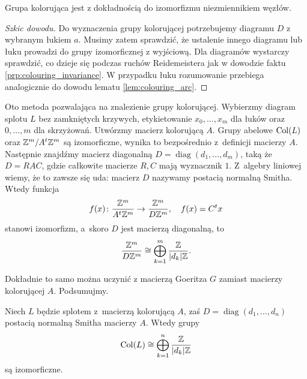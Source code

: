 \begin{proposition}
    Grupa kolorująca jest z dokładnością do izomorfizmu niezmiennikiem węzłów.
\end{proposition}

\begin{proof}[Szkic dowodu]
    Do wyznaczenia grupy kolorującej potrzebujemy diagramu $D$ z wybranym łukiem $a$.
    Musimy zatem sprawdzić, że ustalenie innego diagramu lub łuku prowadzi do grupy izomorficznej z wyjściową.
    Dla diagramów wystarczy sprawdzić, co dzieje się podczas ruchów Reidemeistera jak w dowodzie faktu \ref{prp:colouring_invariance}.
    W przypadku łuku rozumowanie przebiega analogicznie do dowodu lematu \ref{lem:colouring_arc}.
\end{proof}

Oto metoda pozwalająca na znalezienie grupy kolorującej.
Wybierzmy diagram splotu $L$ bez zamkniętych krzywych, etykietowanie $x_0, \ldots, x_m$ dla łuków oraz $0, \ldots, m$ dla skrzyżowań.
Utwórzmy macierz kolorującą $A$.
Grupy abelowe $\operatorname{Col}(L)$ oraz $\mathbb Z^m / A^t \mathbb Z^m$ są izomorficzne, wynika to bezpośrednio z~definicji macierzy $A$.
Następnie znajdźmy macierz diagonalną $D = \operatorname{diag}(d_1, \ldots, d_m)$, taką że $D = RAC$, gdzie całkowite macierze $R, C$ mają wyznacznik $1$.
Z~algebry liniowej wiemy, że to zawsze się uda: macierz $D$ nazywamy postacią normalną Smitha.
Wtedy funkcja
\begin{equation}
    f(x) \colon \frac{\mathbb Z^m}{A^t \mathbb Z^m} \to \frac{\mathbb Z^m}{D\mathbb Z^m}, \quad f(x) = C^t x
\end{equation}
stanowi izomorfizm, a~skoro $D$ jest macierzą diagonalną, to
\begin{equation}
    \frac{\mathbb Z^m}{D\mathbb Z^m} \cong \bigoplus_{k=1}^m \frac{\mathbb Z}{|d_k| \mathbb Z}.
\end{equation}

Dokładnie to samo można uczynić z macierzą Goeritza $G$ zamiast macierzy kolorującej $A$.
Podsumujmy.

\begin{proposition}
\label{prp:colouring_group_summands}%
    Niech $L$ będzie splotem z~macierzą kolorującą $A$, zaś $D = \operatorname{diag}(d_1, \ldots, d_n)$ postacią normalną Smitha macierzy $A$.
    Wtedy grupy 
    \begin{equation}
        \operatorname{Col}(L) \cong \bigoplus_{k=1}^n \frac{\mathbb Z}{|d_k| \mathbb Z}
    \end{equation}
    są izomorficzne.
\end{proposition}

